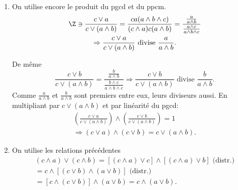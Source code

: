 \begin{enumerate}
 \item On utilise encore le produit du pgcd et du ppcm.
\begin{multline*}
 \Z \ni \frac{c \vee a}{c \vee(a \wedge b)}
 = \frac{ca(a \wedge b \wedge c)}{(c \wedge a) c(a\wedge b)}
 = \frac{\frac{a}{a\wedge b}}{\frac{a \wedge c}{a\wedge b \wedge c}}\\
 \Rightarrow 
 \frac{c \vee a}{c \vee(a \wedge b)} \text{ divise }\frac{a}{a\wedge b}.
\end{multline*}

De même
\[
 \frac{c \vee b}{c \vee(a \wedge b)}
 = \frac{\frac{b}{a\wedge b}}{\frac{b \wedge c}{a\wedge b \wedge c}}
 \Rightarrow 
 \frac{c \vee b}{c \vee(a \wedge b)} \text{ divise }\frac{b}{a\wedge b}.
\]
Comme $\frac{a}{a\wedge b}$ et $\frac{b}{a\wedge b}$ sont premiers entre eux, leurs diviseurs aussi.\newline
En multipliant par $c\vee(a\wedge b)$ et par linéarité du pgcd:
\begin{multline*}
 \left( \frac{c \vee a}{c\vee(a \wedge b)}\right) \wedge \left( \frac{c \vee b}{c\vee(a \wedge b)}\right) = 1 \\
 \Rightarrow (c\vee a)\wedge (c \vee b)= c\vee(a\wedge b).
\end{multline*}

 \item On utilise les relations précédentes
\begin{multline*}
 (c\wedge a)\vee (c \wedge b) 
 = \left[ (c \wedge a)\vee c\right] \wedge \left[ (c \wedge a)\vee b\right] \text{ (distr.)} \\
 = c \wedge \left[ (c \vee b) \wedge (a \vee b) \right] \text{ (distr.)} \\
 = \left[ c \wedge (c \vee b) \right] \wedge (a \vee b) 
 = c \wedge (a \vee b).
\end{multline*}

\end{enumerate}
